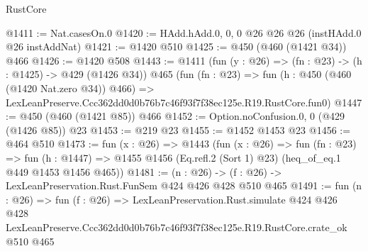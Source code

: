 \begin{lexlean}{RustCore}
\begin{coremodule}
@1411 := Nat.casesOn.{0}
@1420 := HAdd.hAdd.{0, 0, 0} @26 @26 @26 (instHAdd.{0} @26 instAddNat)
@1421 := @1420 @510
@1425 := @450 (@460 (@1421 @34)) @466
@1426 := @1420 @508
@1443 := @1411
    (fun (y : @26) => (fn : @23) -> (h : @1425) -> @429 (@1426 @34))
    @465
    (fun (fn : @23) =>
    fun (h : @450 (@460 (@1420 Nat.zero @34)) @466) =>
    LexLeanPreserve.Ccc362dd0d0b76b7c46f93f7f38ec125e.R19.RustCore.fun0)
@1447 := @450 (@460 (@1421 @85)) @466
@1452 := Option.noConfusion.{0, 0} (@429 (@1426 @85)) @23
@1453 := @219 @23
@1455 := @1452 @1453 @23
@1456 := @464 @510
@1473 := fun (x : @26) =>
  @1443
    (fun (x : @26) =>
    fun (fn : @23) =>
    fun (h : @1447) => @1455 @1456 (Eq.refl.{2} (Sort 1) @23) (heq_of_eq.{1} @449 @1453 @1456 @465))
@1481 := (n : @26) -> (f : @26) -> LexLeanPreservation.Rust.FunSem @424 @426 @428 @510 @465
@1491 := fun (n : @26) =>
  fun (f : @26) =>
  LexLeanPreservation.Rust.simulate
    @424
    @426
    @428
    LexLeanPreserve.Ccc362dd0d0b76b7c46f93f7f38ec125e.R19.RustCore.crate_ok
    @510
    @465
\end{coremodule}
\end{lexlean}
